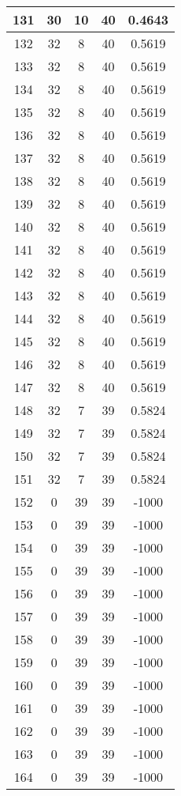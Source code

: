 \documentclass[letterpaper, 12pt]{article}
\begin{document}
\begin{longtable}{|c|c|c|c|c|}
\hline
131 & 30 & 10 & 40 & 0.4643 \\
\hline
132 & 32 & 8 & 40 & 0.5619 \\
\hline
133 & 32 & 8 & 40 & 0.5619 \\
\hline
134 & 32 & 8 & 40 & 0.5619 \\
\hline
135 & 32 & 8 & 40 & 0.5619 \\
\hline
136 & 32 & 8 & 40 & 0.5619 \\
\hline
137 & 32 & 8 & 40 & 0.5619 \\
\hline
138 & 32 & 8 & 40 & 0.5619 \\
\hline
139 & 32 & 8 & 40 & 0.5619 \\
\hline
140 & 32 & 8 & 40 & 0.5619 \\
\hline
141 & 32 & 8 & 40 & 0.5619 \\
\hline
142 & 32 & 8 & 40 & 0.5619 \\
\hline
143 & 32 & 8 & 40 & 0.5619 \\
\hline
144 & 32 & 8 & 40 & 0.5619 \\
\hline
145 & 32 & 8 & 40 & 0.5619 \\
\hline
146 & 32 & 8 & 40 & 0.5619 \\
\hline
147 & 32 & 8 & 40 & 0.5619 \\
\hline
148 & 32 & 7 & 39 & 0.5824 \\
\hline
149 & 32 & 7 & 39 & 0.5824 \\
\hline
150 & 32 & 7 & 39 & 0.5824 \\
\hline
151 & 32 & 7 & 39 & 0.5824 \\
\hline
152 & 0 & 39 & 39 & -1000 \\
\hline
153 & 0 & 39 & 39 & -1000 \\
\hline
154 & 0 & 39 & 39 & -1000 \\
\hline
155 & 0 & 39 & 39 & -1000 \\
\hline
156 & 0 & 39 & 39 & -1000 \\
\hline
157 & 0 & 39 & 39 & -1000 \\
\hline
158 & 0 & 39 & 39 & -1000 \\
\hline
159 & 0 & 39 & 39 & -1000 \\
\hline
160 & 0 & 39 & 39 & -1000 \\
\hline
161 & 0 & 39 & 39 & -1000 \\
\hline
162 & 0 & 39 & 39 & -1000 \\
\hline
163 & 0 & 39 & 39 & -1000 \\
\hline
164 & 0 & 39 & 39 & -1000 \\

\end{longtable}
\end{document}
